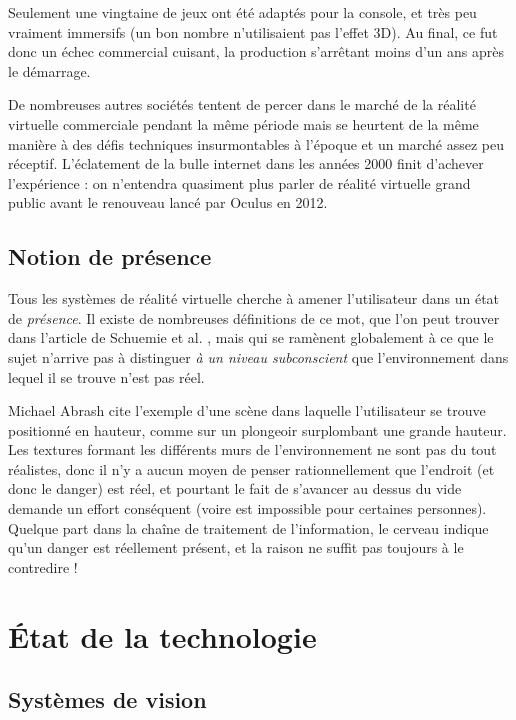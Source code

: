 \documentclass[a4,12pt]{scrartcl}
\begin{document}
Seulement une vingtaine de jeux ont été adaptés pour la console, et très peu vraiment immersifs (un bon nombre n'utilisaient pas l'effet 3D). Au final, ce fut donc un échec commercial cuisant, la production s'arrêtant moins d'un ans après le démarrage. 

De nombreuses autres sociétés tentent de percer dans le marché de la réalité virtuelle commerciale pendant la même période mais se heurtent de la même manière à des défis techniques insurmontables à l'époque et un marché assez peu réceptif. L'éclatement de la bulle internet dans les années 2000 finit d'achever l'expérience : on n'entendra quasiment plus parler de réalité virtuelle grand public avant le renouveau lancé par Oculus en 2012.

\subsection{Notion de présence}


Tous les systèmes de réalité virtuelle cherche à amener l'utilisateur dans un état de \emph{présence}. Il existe de nombreuses définitions de ce mot, que l'on peut trouver dans l'article de Schuemie et al. \cite{schuemie2001research}, mais qui se ramènent globalement à ce que le sujet n'arrive pas à distinguer \emph{à un niveau subconscient} que l'environnement dans lequel il se trouve n'est pas réel.

Michael Abrash \cite{Abrash14} cite l'exemple d'une scène dans laquelle l'utilisateur se trouve positionné en hauteur, comme sur un plongeoir surplombant une grande hauteur. Les textures formant les différents murs de l'environnement ne sont pas du tout réalistes, donc il n'y a aucun moyen de penser rationnellement que l'endroit (et donc le danger) est réel, et pourtant le fait de s'avancer au dessus du vide demande un effort conséquent (voire est impossible pour certaines personnes). Quelque part dans la chaîne de traitement de l'information, le cerveau indique qu'un danger est réellement présent, et la raison ne suffit pas toujours à le contredire !


\section{État de la technologie}

\subsection{Systèmes de vision}
\label{sysvis}
\end{document}
